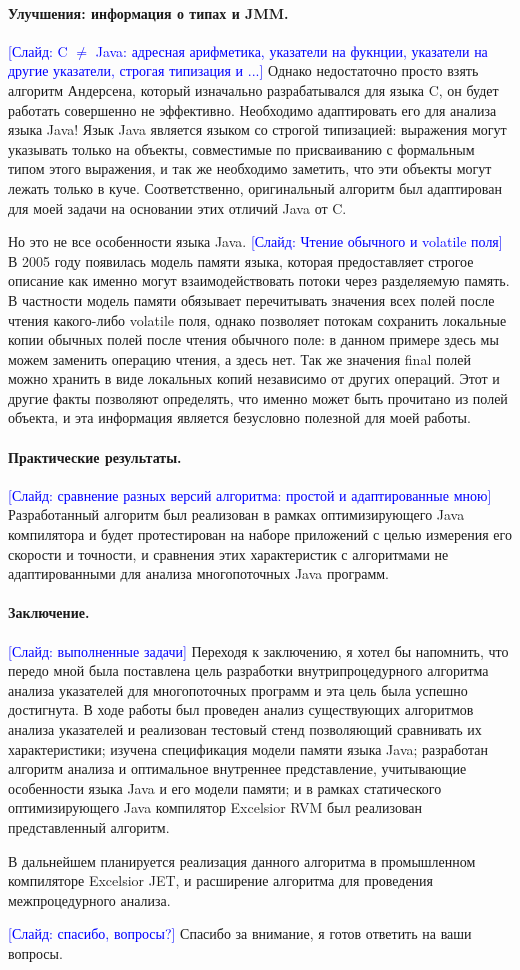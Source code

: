 \documentclass[12pt]{article}
\newcommand{\slide}[1]{\textcolor{Blue}{[Слайд: #1]}}
\newcommand{\eng}[1]{{\English#1}}
\begin{document}
  \paragraph{Улучшения: информация о типах и JMM.}
  \slide{C $\neq$ Java: адресная арифметика, указатели на фукнции, указатели на
  другие указатели, строгая типизация и ...}
  Однако недостаточно просто взять алгоритм Андерсена, который изначально
  разрабатывался для языка C, он будет работать совершенно не эффективно.
  Необходимо адаптировать его для анализа языка Java! Язык Java является языком
  со строгой типизацией: выражения могут указывать только на объекты,
  совместимые по присваиванию с формальным типом этого выражения, и так же
  необходимо заметить, что эти объекты могут лежать только в куче.
  Соответственно, оригинальный алгоритм был адаптирован для моей задачи на
  основании этих отличий Java от C.

  Но это не все особенности языка Java.
  \slide{Чтение обычного и \eng{volatile} поля}
  В 2005 году появилась модель памяти языка, которая предоставляет строгое
  описание как именно могут взаимодействовать потоки через разделяемую память.
  В частности модель памяти обязывает перечитывать значения всех полей после
  чтения какого-либо \eng{volatile} поля, однако позволяет потокам сохранить
  локальные копии обычных полей после чтения обычного поле: в данном примере
  здесь мы можем заменить операцию чтения, а здесь нет. Так же значения
  \eng{final} полей можно хранить в виде локальных копий независимо от других
  операций. Этот и другие факты позволяют определять, что именно может быть
  прочитано из полей объекта, и эта информация является безусловно полезной для
  моей работы.

  \paragraph{Практические результаты.}
  \slide{сравнение разных версий алгоритма: простой и адаптированные мною}
  Разработанный алгоритм был реализован в рамках оптимизирующего Java
  компилятора и будет протестирован на наборе приложений с целью измерения его
  скорости и точности, и сравнения этих характеристик с алгоритмами не
  адаптированными для анализа многопоточных Java программ.

  \paragraph{Заключение.}
  \slide{выполненные задачи}
  Переходя к заключению, я хотел бы напомнить, что передо мной была поставлена
  цель разработки внутрипроцедурного алгоритма анализа указателей для
  многопоточных программ и эта цель была успешно достигнута.
  В ходе работы был
  проведен анализ существующих алгоритмов анализа указателей и реализован
  тестовый стенд позволяющий сравнивать их характеристики;
  изучена спецификация модели памяти языка Java;
  разработан алгоритм анализа и оптимальное внутреннее представление,
  учитывающие особенности языка Java и его модели памяти;
  и в рамках статического оптимизирующего Java компилятор Excelsior RVM
  был реализован представленный алгоритм.

  В дальнейшем планируется реализация данного алгоритма в промышленном
  компиляторе Excelsior JET, и расширение алгоритма для проведения
  межпроцедурного анализа.

  \slide{спасибо, вопросы?}
  Спасибо за внимание, я готов ответить на ваши вопросы.
\end{document}
